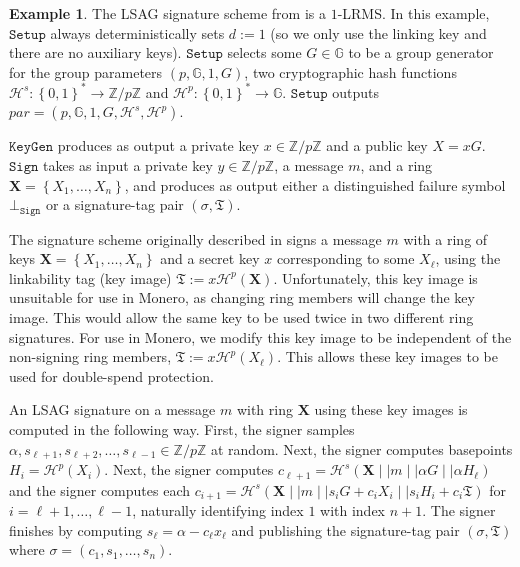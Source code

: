 \documentclass{article}
\theoremstyle{plain}
\theoremstyle{definition}
\newtheorem{example}{Example}[section]
\begin{document}
\begin{example}\label{ex:lsag}
The LSAG signature scheme from \cite{liu2004linkable} is a $1$-LRMS. In this example, $\texttt{Setup}$ always deterministically sets $d:=1$ (so we only use the linking key and there are no auxiliary keys). $\texttt{Setup}$ selects some $G \in \mathbb{G}$ to be a group generator for the group parameters $(p, \mathbb{G}, 1, G)$, two cryptographic hash functions $\mathcal{H}^s:\left\{0,1\right\}^* \to \mathbb{Z}/p\mathbb{Z}$ and $\mathcal{H}^p:\left\{0,1\right\}^* \to \mathbb{G}$. $\texttt{Setup}$ outputs $\textit{par} = (p, \mathbb{G}, 1, G, \mathcal{H}^s, \mathcal{H}^p)$.

$\texttt{KeyGen}$ produces as output a private key $x \in \mathbb{Z}/p\mathbb{Z}$ and a public key $X = xG$. $\texttt{Sign}$ takes as input a private key $y \in \mathbb{Z}/p\mathbb{Z}$, a message $m$, and a ring $\textbf{X} = \left\{X_1, \ldots, X_n\right\}$, and produces as output either a distinguished failure symbol $\bot_{\texttt{Sign}}$ or a signature-tag pair $(\sigma, \mathfrak{T})$.  

The signature scheme originally described in \cite{liu2004linkable} signs a message $m$ with a ring of keys $\textbf{X} = \left\{X_1, \ldots, X_n\right\}$ and a secret key $x$ corresponding to some $X_\ell$, using the linkability tag (key image) $\mathfrak{T} := x \mathcal{H}^p(\textbf{X})$. Unfortunately, this key image is unsuitable for use in Monero, as changing ring members will change the key image. This would allow the same key to be used twice in two different ring signatures. For use in Monero, we modify this key image to be independent of the non-signing ring members, $\mathfrak{T} := x \mathcal{H}^p(X_\ell)$. This allows these key images to be used for double-spend protection.

An LSAG signature on a message $m$ with ring $\textbf{X}$ using these key images is computed in the following way. First, the signer samples $\alpha, s_{\ell+1}, s_{\ell+2}, \ldots, s_{\ell-1} \in \mathbb{Z}/p\mathbb{Z}$ at random. Next, the signer computes basepoints $H_i = \mathcal{H}^p(X_i)$. Next, the signer computes $c_{\ell+1}  = \mathcal{H}^s(\textbf{X} \mid \mid m \mid \mid \alpha G \mid \mid \alpha H_\ell)$ and the signer computes each $c_{i+1} = \mathcal{H}^s(\textbf{X} \mid \mid m \mid \mid s_i G + c_i X_i \mid \mid s_i H_i + c_i \mathfrak{T})$ for $i = \ell+1, \ldots, \ell-1$, naturally identifying index $1$ with index $n+1$. The signer finishes by computing $s_\ell = \alpha - c_\ell x_\ell$ and publishing the signature-tag pair $(\sigma, \mathfrak{T})$ where $\sigma = (c_1, s_1, \ldots, s_n)$.


\end{example}
\end{document}
